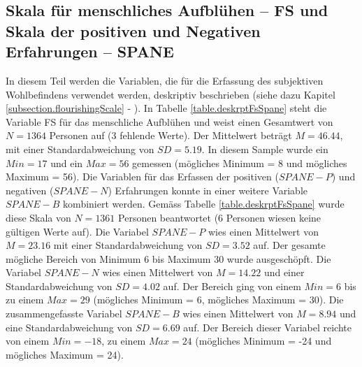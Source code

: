 \subsection{Skala für menschliches Aufblühen -- FS und Skala der positiven und Negativen Erfahrungen -- SPANE}
In diesem Teil werden die Variablen, die für die Erfassung des subjektiven Wohlbefindens verwendet werden, deskriptiv beschrieben (siehe dazu Kapitel \ref{subsection.flourishingScale} - ). In Tabelle \ref{table.deskrptFsSpane} steht die Variable FS für das menschliche Aufblühen und weist einen Gesamtwert von $N = 1364$ Personen auf (3 fehlende Werte). Der Mittelwert beträgt $M = 46.44$, mit einer Standardabweichung von $SD = 5.19$. In diesem Sample wurde ein $Min = 17$ und ein $Max = 56$ gemessen (mögliches Minimum = 8 und mögliches Maximum = 56). Die Variablen für das Erfassen der positiven ($SPANE-P$) und negativen ($SPANE-N$) Erfahrungen konnte in einer weitere Variable $SPANE-B$ kombiniert werden. Gemäss Tabelle \ref{table.deskrptFsSpane} wurde diese Skala von $N = 1361$ Personen beantwortet (6 Personen wiesen keine gültigen Werte auf). Die Variabel $SPANE-P$ wies einen Mittelwert von $M = 23.16$ mit einer Standardabweichung von $SD = 3.52$ auf. Der gesamte mögliche Bereich von Minimum 6 bis Maximum 30 wurde ausgeschöpft. Die Variabel $SPANE-N$ wies einen Mittelwert von $M=14.22$ und einer Standardabweichung von $SD=4.02$ auf. Der Bereich ging von einem $Min = 6$ bis zu einem $Max = 29$ (mögliches Minimum = 6, mögliches Maximum = 30). Die zusammengefasste Variabel $SPANE-B$ wies einen Mittelwert von $M = 8.94$ und eine Standardabweichung von $SD = 6.69$ auf. Der Bereich dieser Variabel reichte von einem $Min = -18$, zu einem $Max = 24$ (mögliches Minimum = -24 und mögliches Maximum = 24).

